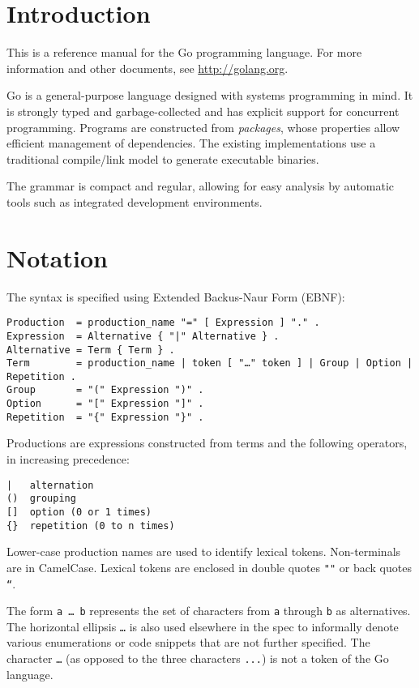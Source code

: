 \section*{Introduction}

This is a reference manual for the Go programming language. For more
information and other documents, see
\href{http://golang.org/}{http://golang.org}.

Go is a general-purpose language designed with systems programming in
mind. It is strongly typed and garbage-collected and has explicit
support for concurrent programming. Programs are constructed from
\emph{packages}, whose properties allow efficient management of
dependencies. The existing implementations use a traditional
compile/link model to generate executable binaries.

The grammar is compact and regular, allowing for easy analysis by
automatic tools such as integrated development environments.

\section*{Notation}

The syntax is specified using Extended Backus-Naur Form (EBNF):

\begin{Verbatim}[frame=single]
Production  = production_name "=" [ Expression ] "." .
Expression  = Alternative { "|" Alternative } .
Alternative = Term { Term } .
Term        = production_name | token [ "…" token ] | Group | Option | Repetition .
Group       = "(" Expression ")" .
Option      = "[" Expression "]" .
Repetition  = "{" Expression "}" .
\end{Verbatim}

Productions are expressions constructed from terms and the following
operators, in increasing precedence:

\begin{Verbatim}[frame=single]
|   alternation
()  grouping
[]  option (0 or 1 times)
{}  repetition (0 to n times)
\end{Verbatim}

Lower-case production names are used to identify lexical tokens.
Non-terminals are in CamelCase. Lexical tokens are enclosed in double
quotes \texttt{""} or back quotes \texttt{``}.

The form \texttt{a \ldots{} b} represents the set of characters from
\texttt{a} through \texttt{b} as alternatives. The horizontal ellipsis
\texttt{\ldots{}} is also used elsewhere in the spec to informally
denote various enumerations or code snippets that are not further
specified. The character \texttt{\ldots{}} (as opposed to the three
characters \texttt{...}) is not a token of the Go language.

